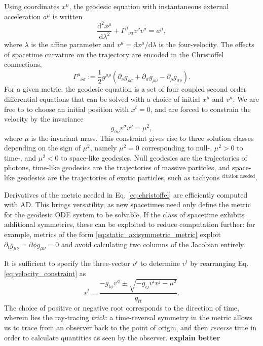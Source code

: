 \documentclass[fleqn,usenatbib]{mnras}
\newcommand{\citneeded}{{\bf \color{red} $^{\text{citation needed}}$}}
\newcommand{\todo}[1]{{\bf \color{red} #1}}
\renewcommand{\d}{\text{d}}
\newcommand{\utensor}[3]{#1^{#2}_{\phantom{#2}#3}}
\newcommand{\vel}[1]{v^{#1}}
\begin{document}
Using coordinates $x^\mu$, the geodesic equation with instantaneous external
acceleration $a^\mu$ is written
\begin{equation}
\label{eq:geodesic_equation}
    \frac{\d^2 x^\mu}{\d \lambda^2}
    + \utensor{\Gamma}{\mu}{\nu\sigma}
    \vel{\nu}
    \vel{\sigma}
    = a^\mu,
\end{equation}
where $\lambda$ is the affine parameter and $v^\mu = \d x^\mu / \d \lambda$ is
the four-velocity. The effects of spacetime curvature on the trajectory are
encoded in the Christoffel connections, 
\begin{equation}
\label{eq:christoffel}
    \utensor{\Gamma}{\mu}{\nu\sigma}
    := \frac{1}{2} g^{\mu\rho} 
    \left(
        \partial_{\nu}g_{\rho \sigma}
        + \partial_{\sigma}g_{\rho \nu}
        - \partial_{\rho}g_{\sigma \nu}
    \right).
\end{equation}
For a given metric, the geodesic equation is a set of four coupled second order
differential equations that can be solved with a choice of initial $x^\mu$ and
$\vel{\mu}$. We are free to to choose an initial position with $x^t = 0$, and
are forced to constrain the velocity by the invariance
\begin{equation}
\label{eq:velocity_constraint}
    g_{\sigma\nu} \vel{\sigma} \vel{\nu} = \mu^2,
\end{equation}
where $\mu$ is the invariant mass. This constraint gives rise to three solution
classes depending on the sign of $\mu^2$, namely $\mu^2 = 0$ corresponding to
null-, $\mu^2 > 0$ to time-, and $\mu^2 < 0$ to space-like geodesics. Null
geodesics are the trajectories of photons, time-like geodesics are the
trajectories of massive particles, and space-like geodesics are the
trajectories of exotic particles, such as tachyons \citneeded. 

Derivatives of the metric needed in Eq. \eqref{eq:christoffel} are efficiently
computed with AD. This brings versatility, as new spacetimes need only define
the metric for the geodesic ODE system to be solvable. If the class of
spacetime exhibits additional symmetries, these can be exploited to reduce
computation further: for example, metrics of the form
\eqref{eq:static_axisymmetric_metric} exploit $\partial_t g_{\mu\nu} =
\partial{\phi} g_{\mu\nu} = 0$ and avoid calculating two columns of the
Jacobian entirely.

It is sufficient to specify the three-vector $\vel{i}$ to determine $\vel{t}$
by rearranging Eq. \eqref{eq:velocity_constraint} as
\begin{equation}
\vel{t}  = \frac{-g_{t\phi} \vel{\phi} \pm
    \sqrt{-g_{ij} \vel{i} \vel{j} - \mu^2}
}{g_{tt}}.
\end{equation}
The choice of positive or negative root corresponds to the direction of time,
wherein lies the ray-tracing \textit{trick}: a time-reversal symmetry in the
metric allows us to trace from an observer back to the point of origin, and
then \textit{reverse} time in order to calculate quantities as seen by the
observer. \todo{explain better}
\end{document}
